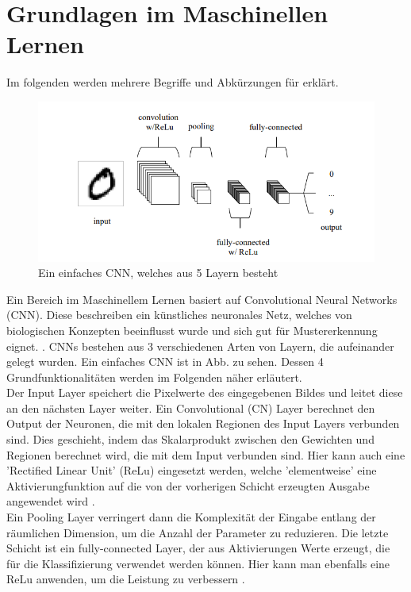 {
	\section{Grundlagen im Maschinellen Lernen}
	{ 
	Im folgenden werden mehrere Begriffe und Abkürzungen für  erklärt. \\
	\begin{figure}[ht]
		\centering
		\includegraphics*[scale = 0.8, keepaspectratio, trim=2 2 2 2 ]{images/YOLO/YOLO_Preamble_Simple_CNN.png}
		\caption[Ein einfaches Convolutional Neural Network]{Ein einfaches CNN, welches aus 5 Layern besteht \citep{OSheaRyan2022}}
		\label{YOLO_simple_CNN}
 	\end{figure}

	Ein Bereich im Maschinellem Lernen basiert auf Convolutional Neural Networks (CNN). Diese beschreiben ein künstliches neuronales Netz, welches von biologischen Konzepten beeinflusst wurde und sich gut für Mustererkennung eignet. \citep{Matsugu2003}. 
	CNNs bestehen aus 3 verschiedenen Arten von Layern, die aufeinander gelegt wurden. Ein einfaches CNN ist in Abb.  zu sehen. Dessen 4 Grundfunktionalitäten werden im Folgenden näher erläutert. \\
	Der Input Layer speichert die Pixelwerte des eingegebenen Bildes und leitet diese an den nächsten Layer weiter. Ein Convolutional (CN) Layer berechnet den Output der Neuronen, die mit den lokalen Regionen des Input Layers verbunden sind. Dies geschieht, indem das Skalarprodukt zwischen den Gewichten und Regionen berechnet wird, die mit dem Input verbunden sind. Hier kann auch eine 'Rectified Linear Unit' (ReLu) eingesetzt werden, welche 'elementweise' eine Aktivierungfunktion auf die von der vorherigen Schicht erzeugten Ausgabe angewendet wird \citep{OSheaRyan2022}. \\
	Ein Pooling Layer verringert dann die Komplexität der Eingabe entlang der räumlichen Dimension, um die Anzahl der Parameter zu reduzieren. Die letzte Schicht ist ein fully-connected Layer, der aus Aktivierungen Werte erzeugt, die für die Klassifizierung verwendet werden können. Hier kann man ebenfalls eine ReLu anwenden, um die Leistung zu verbessern \citep{OSheaRyan2022}. \\

}}
